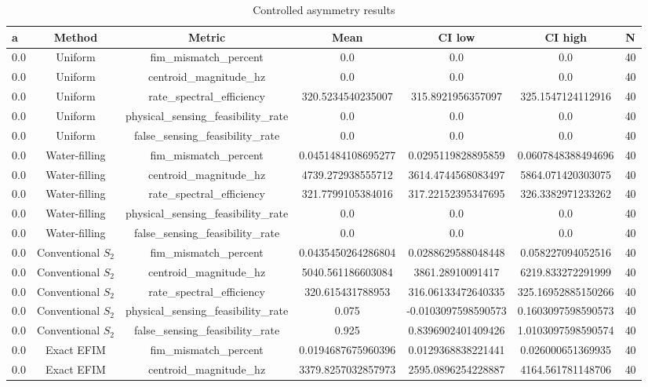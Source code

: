 \begin{table}[t]
\centering
\caption{Controlled asymmetry results}
\label{tab:tilt}
\begin{tabular}{lcccccc}
\hline
a & Method & Metric & Mean & CI low & CI high & N \\
\hline
0.0 & Uniform & fim_mismatch_percent & 0.0 & 0.0 & 0.0 & 40 \\
0.0 & Uniform & centroid_magnitude_hz & 0.0 & 0.0 & 0.0 & 40 \\
0.0 & Uniform & rate_spectral_efficiency & 320.5234540235007 & 315.8921956357097 & 325.1547124112916 & 40 \\
0.0 & Uniform & physical_sensing_feasibility_rate & 0.0 & 0.0 & 0.0 & 40 \\
0.0 & Uniform & false_sensing_feasibility_rate & 0.0 & 0.0 & 0.0 & 40 \\
0.0 & Water-filling & fim_mismatch_percent & 0.0451484108695277 & 0.0295119828895859 & 0.0607848388494696 & 40 \\
0.0 & Water-filling & centroid_magnitude_hz & 4739.272938555712 & 3614.4744568083497 & 5864.071420303075 & 40 \\
0.0 & Water-filling & rate_spectral_efficiency & 321.7799105384016 & 317.22152395347695 & 326.3382971233262 & 40 \\
0.0 & Water-filling & physical_sensing_feasibility_rate & 0.0 & 0.0 & 0.0 & 40 \\
0.0 & Water-filling & false_sensing_feasibility_rate & 0.0 & 0.0 & 0.0 & 40 \\
0.0 & Conventional $S_2$ & fim_mismatch_percent & 0.0435450264286804 & 0.0288629588048448 & 0.058227094052516 & 40 \\
0.0 & Conventional $S_2$ & centroid_magnitude_hz & 5040.561186603084 & 3861.28910091417 & 6219.833272291999 & 40 \\
0.0 & Conventional $S_2$ & rate_spectral_efficiency & 320.615431788953 & 316.06133472640335 & 325.16952885150266 & 40 \\
0.0 & Conventional $S_2$ & physical_sensing_feasibility_rate & 0.075 & -0.0103097598590573 & 0.1603097598590573 & 40 \\
0.0 & Conventional $S_2$ & false_sensing_feasibility_rate & 0.925 & 0.8396902401409426 & 1.0103097598590574 & 40 \\
0.0 & Exact EFIM & fim_mismatch_percent & 0.0194687675960396 & 0.0129368838221441 & 0.026000651369935 & 40 \\
0.0 & Exact EFIM & centroid_magnitude_hz & 3379.8257032857973 & 2595.0896254228887 & 4164.561781148706 & 40 \\

\end{tabular}
\end{table}
